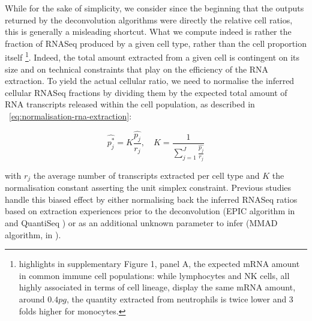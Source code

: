 \documentclass[long, final]{jobim}
\begin{document}
While for the sake of simplicity, we consider since the beginning that the outputs returned by the deconvolution algorithms were directly the relative cell ratios, this is generally a misleading shortcut. What we compute indeed is rather the fraction of RNASeq produced by a given cell type, rather than the cell proportion itself \footnote{\cite{racle_etal17}highlights in supplementary Figure 1, panel A, the expected mRNA amount in common immune cell populations: while lymphocytes and NK cells, all highly associated in terms of cell lineage, display the same mRNA amount, around $0.4 \unit{pg}$, the quantity extracted from neutrophils is twice lower and 3 folds higher for monocytes.}. Indeed, the total amount extracted from a given cell is contingent on its size and on technical constraints that play on the efficiency of the RNA extraction. To yield the actual cellular ratio, we need to normalise the inferred cellular RNASeq fractions by dividing them by the expected total amount of RNA transcripts released within the cell population, as described in \equationname ~\ref{eq:normalisation-rna-extraction}:

\begin{equation}
    \hat{p^*_j} = K \frac{\hat{p_j}}{r_j}, \quad K= \frac{1}{\sum_{j=1}^J \frac{\hat{p_j}}{r_j}}
    \label{eq:normalisation-rna-extraction}
\end{equation}

with $r_j$ the average number of transcripts extracted per cell type and $K$ the normalisation constant asserting the unit simplex constraint. Previous studies handle this biased effect by either normalising back the inferred RNASeq ratios based on extraction experiences prior to the deconvolution (EPIC algorithm in \cite{racle_etal17} and QuantiSeq \cite{finotello_etal19}) or as an additional unknown parameter to infer (MMAD algorithm, in \cite{liebner_etal14}).
\end{document}
